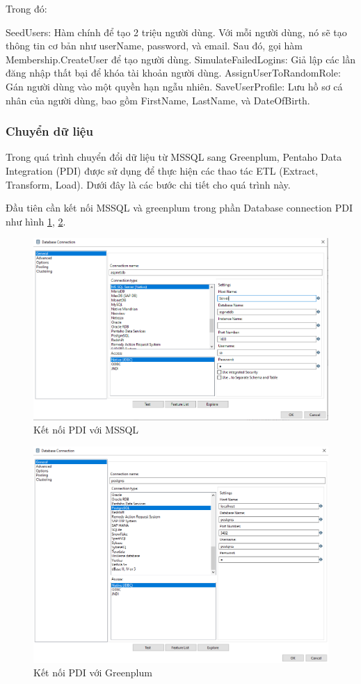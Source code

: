 \documentclass[14pt]{article}
\begin{document}
Trong đó:

SeedUsers: Hàm chính để tạo 2 triệu người dùng. Với mỗi người dùng, nó sẽ tạo thông tin cơ bản như userName, password, và email. Sau đó, gọi hàm Membership.CreateUser để tạo người dùng.
SimulateFailedLogins: Giả lập các lần đăng nhập thất bại để khóa tài khoản người dùng.
AssignUserToRandomRole: Gán người dùng vào một quyền hạn ngẫu nhiên.
SaveUserProfile: Lưu hồ sơ cá nhân của người dùng, bao gồm FirstName, LastName, và DateOfBirth.

\subsubsection{Chuyển dữ liệu}

Trong quá trình chuyển đổi dữ liệu từ MSSQL sang Greenplum, Pentaho Data Integration (PDI) được sử dụng để thực hiện các thao tác ETL (Extract, Transform, Load). Dưới đây là các bước chi tiết cho quá trình này.

Đầu tiên cần kết nối MSSQL và greenplum trong phần Database connection PDI như hình \ref{fig:ConMSSQL}, \ref{fig:ConGreenplum}.


\begin{figure}
    \centering
    \includegraphics[width=0.8\linewidth]{images/ConMSSQL.png}
    \caption{Kết nối PDI với MSSQL}
    \label{fig:ConMSSQL}
\end{figure}


\begin{figure}
    \centering
    \includegraphics[width=0.8\linewidth]{images/ConGreenplum.png}
    \caption{Kết nối PDI với Greenplum}
    \label{fig:ConGreenplum}
\end{figure}
\end{document}
